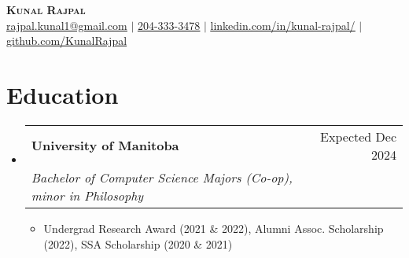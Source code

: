 \documentclass[letterpaper,11pt]{article}
\makeatletter
\newcommand{\resumeItem}[1]{
  \item\small{
    {#1 \vspace{-2pt}}
  }
}
\newcommand{\resumeSubheading}[4]{
  \vspace{-2pt}\item
    \begin{tabular*}{0.97\textwidth}[t]{l@{\extracolsep{\fill}}r}
      \textbf{#1} & #2 \\
      \textit{\small#3} & \textit{\small #4} \\
    \end{tabular*}\vspace{-7pt}
}
\newcommand{\resumeSubSubheading}[2]{
    \item
    \begin{tabular*}{0.97\textwidth}{l@{\extracolsep{\fill}}r}
      \textbf{#1} & #2 \\
    \end{tabular*}\vspace{-7pt}
}
\newcommand{\resumeSubHeadingListStart}{\begin{itemize}[leftmargin=0.15in, label={}]}
\newcommand{\resumeSubHeadingListEnd}{\end{itemize}}
\newcommand{\resumeItemListStart}{\begin{itemize}}
\newcommand{\resumeItemListEnd}{\end{itemize}\vspace{-5pt}}
\makeatother
\begin{document}

\begin{center}
    \textbf{\Huge \scshape {Kunal Rajpal}} \\ \vspace{1pt}
    \href{mailto:rajpal.kunal1@gmail.com}{\ul{rajpal.kunal1@gmail.com}} $|$
    \href{tel:12043333478}{\ul{204-333-3478}} $|$ 
    \href{https://www.linkedin.com/in/kunal-rajpal/}{\ul{linkedin.com/in/kunal-rajpal/}} $|$
    \href{https://github.com/KunalRajpal}{\ul{github.com/KunalRajpal}}
\end{center}


\section{Education}

  \resumeSubHeadingListStart
  
    \resumeSubheading
      {University of Manitoba}{Expected Dec 2024}
      {Bachelor of Computer Science Majors (Co-op), minor in Philosophy}{}
      
     \resumeItemListStart
        \resumeItem{Undergrad Research Award (2021 \& 2022), Alumni Assoc. Scholarship (2022), SSA Scholarship (2020 \& 2021)}

     \resumeItemListEnd
      
  \resumeSubHeadingListEnd



\end{document}
